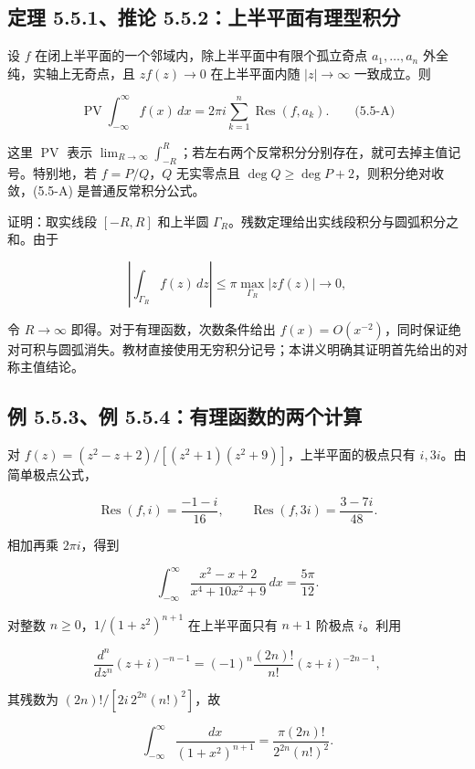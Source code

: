 \documentclass[11pt,a4paper]{article}
\begin{document}
\subsection{定理 5.5.1、推论 5.5.2：上半平面有理型积分}\label{ch05-s5-heading-1}

设 \(f\) 在闭上半平面的一个邻域内，除上半平面中有限个孤立奇点
\(a_1,\ldots,a_n\) 外全纯，实轴上无奇点，且 \(zf(z)\to0\) 在上半平面内随
\(|z|\to\infty\) 一致成立。则

\[
\operatorname{PV}\int_{-\infty}^{\infty}f(x)\,dx
=2\pi i\sum_{k=1}^n\operatorname{Res}(f,a_k).
\qquad\text{(5.5-A)}
\]

这里 \(\operatorname{PV}\) 表示
\(\lim_{R\to\infty}\int_{-R}^R\)；若左右两个反常积分分别存在，就可去掉主值记号。特别地，若
\(f=P/Q\)，\(Q\) 无实零点且
\(\deg Q\ge\deg P+2\)，则积分绝对收敛，(5.5-A) 是普通反常积分公式。

证明：取实线段 \([-R,R]\) 和上半圆
\(\Gamma_R\)。残数定理给出实线段积分与圆弧积分之和。由于

\[
\left|\int_{\Gamma_R}f(z)\,dz\right|
\le\pi\max_{\Gamma_R}|zf(z)|\longrightarrow0,
\]

令 \(R\to\infty\) 即得。对于有理函数，次数条件给出
\(f(x)=O(x^{-2})\)，同时保证绝对可积与圆弧消失。教材直接使用无穷积分记号；本讲义明确其证明首先给出的对称主值结论。

\subsection{例 5.5.3、例 5.5.4：有理函数的两个计算}\label{ch05-s5-heading-2}

对 \(f(z)=(z^2-z+2)/[(z^2+1)(z^2+9)]\)，上半平面的极点只有
\(i,3i\)。由简单极点公式，

\[
\operatorname{Res}(f,i)=\frac{-1-i}{16},\qquad
\operatorname{Res}(f,3i)=\frac{3-7i}{48}.
\]

相加再乘 \(2\pi i\)，得到

\[
\int_{-\infty}^{\infty}\frac{x^2-x+2}{x^4+10x^2+9}\,dx=\frac{5\pi}{12}.
\]

对整数 \(n\ge0\)，\(1/(1+z^2)^{n+1}\) 在上半平面只有 \(n+1\) 阶极点
\(i\)。利用

\[
\frac{d^n}{dz^n}(z+i)^{-n-1}
=(-1)^n\frac{(2n)!}{n!}(z+i)^{-2n-1},
\]

其残数为 \((2n)!/[2i\,2^{2n}(n!)^2]\)，故

\[
\int_{-\infty}^{\infty}\frac{dx}{(1+x^2)^{n+1}}
=\frac{\pi(2n)!}{2^{2n}(n!)^2}.
\]
\end{document}
